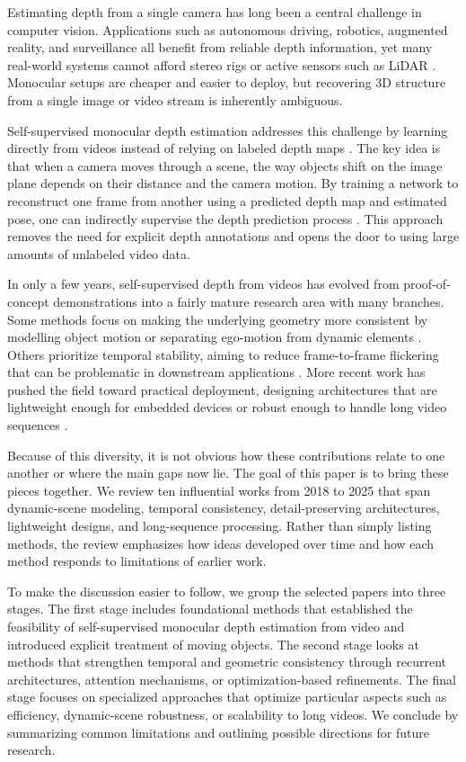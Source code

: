 \documentclass[10pt,twocolumn,letterpaper]{article}
\begin{document}
Estimating depth from a single camera has long been a central challenge in computer vision. Applications such as autonomous driving, robotics, augmented reality, and surveillance all benefit from reliable depth information, yet many real-world systems cannot afford stereo rigs or active sensors such as LiDAR \cite{hartley2003multiple}. Monocular setups are cheaper and easier to deploy, but recovering 3D structure from a single image or video stream is inherently ambiguous.

Self-supervised monocular depth estimation addresses this challenge by learning directly from videos instead of relying on labeled depth maps \cite{lecun2015deep}. The key idea is that when a camera moves through a scene, the way objects shift on the image plane depends on their distance and the camera motion. By training a network to reconstruct one frame from another using a predicted depth map and estimated pose, one can indirectly supervise the depth prediction process \cite{jaderberg2015spatial,godard2019digging}. This approach removes the need for explicit depth annotations and opens the door to using large amounts of unlabeled video data.

In only a few years, self-supervised depth from videos has evolved from proof-of-concept demonstrations into a fairly mature research area with many branches. Some methods focus on making the underlying geometry more consistent by modelling object motion or separating ego-motion from dynamic elements \cite{casser2019depth}. Others prioritize temporal stability, aiming to reduce frame-to-frame flickering that can be problematic in downstream applications \cite{zhang2019exploiting,li2021enforcing}. More recent work has pushed the field toward practical deployment, designing architectures that are lightweight enough for embedded devices \cite{zhang2023lite} or robust enough to handle long video sequences \cite{chen2025video}.

Because of this diversity, it is not obvious how these contributions relate to one another or where the main gaps now lie. The goal of this paper is to bring these pieces together. We review ten influential works from 2018 to 2025 that span dynamic-scene modeling, temporal consistency, detail-preserving architectures, lightweight designs, and long-sequence processing. Rather than simply listing methods, the review emphasizes how ideas developed over time and how each method responds to limitations of earlier work.

To make the discussion easier to follow, we group the selected papers into three stages. The first stage includes foundational methods that established the feasibility of self-supervised monocular depth estimation from video and introduced explicit treatment of moving objects. The second stage looks at methods that strengthen temporal and geometric consistency through recurrent architectures, attention mechanisms, or optimization-based refinements. The final stage focuses on specialized approaches that optimize particular aspects such as efficiency, dynamic-scene robustness, or scalability to long videos. We conclude by summarizing common limitations and outlining possible directions for future research.
\end{document}
